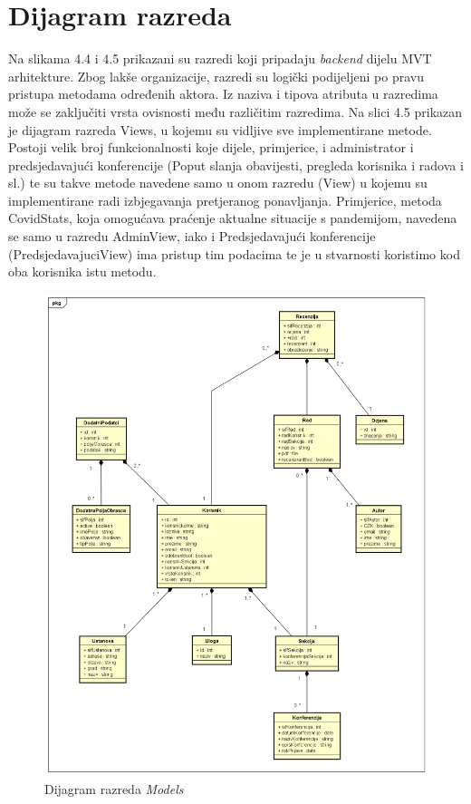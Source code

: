 			
		\section{Dijagram razreda}

		
			Na slikama 4.4 i 4.5 prikazani su razredi koji pripadaju \textit{backend} dijelu MVT arhitekture.
			\newline
			\newline
			\indent Zbog lakše organizacije, razredi su logički podijeljeni po pravu pristupa metodama određenih aktora. Iz naziva i tipova atributa u razredima može se zaključiti vrsta ovisnosti među različitim razredima.
			\newline
			\newline
			\indent Na slici 4.5 prikazan je dijagram razreda Views, u kojemu su vidljive sve implementirane metode. Postoji velik broj funkcionalnosti koje dijele, primjerice, i administrator i predsjedavajući konferencije (Poput slanja obavijesti, pregleda korisnika i radova i sl.) te su takve metode navedene samo u onom razredu (View) u kojemu su implementirane radi izbjegavanja pretjeranog ponavljanja. Primjerice, metoda CovidStats, koja omogućava praćenje aktualne situacije s pandemijom, navedena se samo u razredu AdminView, iako i Predsjedavajući konferencije (PredsjedavajuciView) ima pristup tim podacima te je u stvarnosti koristimo kod oba korisnika istu metodu.

				\begin{figure}[H]
					\includegraphics[width= 15 cm, keepaspectratio]{dijagrami/Modeli_UML.png} 
					\centering
					\caption{Dijagram razreda \textit{Models} }
					\label{fig:DijagramModels}
				\end{figure}

